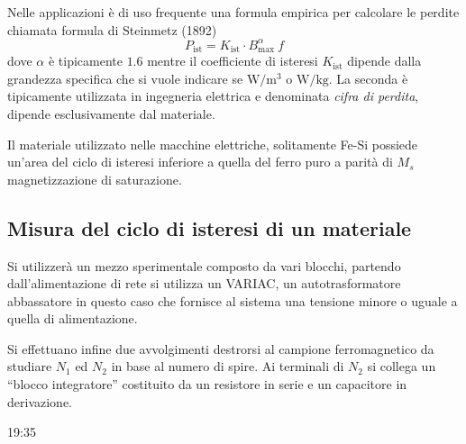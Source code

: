 
Nelle applicazioni è di uso frequente una formula empirica per calcolare le perdite
chiamata formula di Steinmetz (1892)
$$
P_{\text{ist}} = K_\text{ist}\cdot B^\alpha_\text{max}\ f
$$
dove $\alpha$ è tipicamente $1.6$ mentre il coefficiente di isteresi $K_\text{ist}$ dipende
dalla grandezza specifica che si vuole indicare se $\si{\watt\per\meter^3}$ o $\si{\watt\per\kilo\gram}$. La seconda è tipicamente utilizzata in ingegneria elettrica
e denominata \textit{cifra di perdita}, dipende esclusivamente dal materiale.

Il materiale utilizzato nelle macchine elettriche, solitamente Fe-Si possiede 
un'area del ciclo di isteresi inferiore a quella del ferro puro a parità di $M_s$ 
magnetizzazione di saturazione.

\subsection{Misura del ciclo di isteresi di un materiale}
Si utilizzerà un mezzo sperimentale composto da vari blocchi, partendo dall'alimentazione
di rete si utilizza un VARIAC, un autotrasformatore abbassatore in questo caso
che fornisce al sistema una tensione minore o uguale a quella di alimentazione.

Si effettuano infine due avvolgimenti destrorsi al campione ferromagnetico da studiare
$N_1$ ed $N_2$ in base al numero di spire. Ai terminali di $N_2$ si collega un ``blocco
integratore'' costituito da un resistore in serie e un capacitore in derivazione.

19:35


